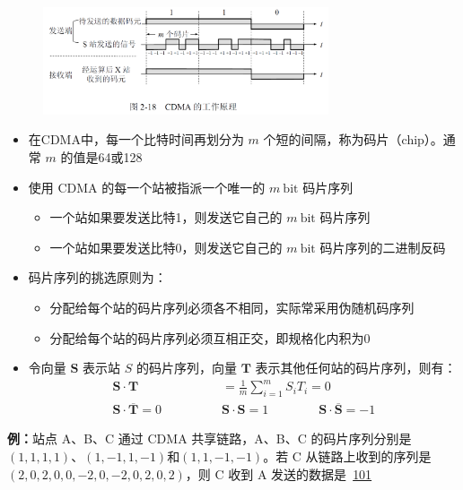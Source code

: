\documentclass[cs4size,a4paper,10pt]{ctexart}
\begin{document}
	\begin{figure}[H]
		\centering
		\includegraphics[width=0.75\textwidth]{img/2.18}
	\end{figure}

	\begin{itemize}
		\item 在CDMA中，每一个比特时间再划分为 $m$ 个短的间隔，称为码片（chip）。通常 $m$ 的值是64或128
		\item 使用 CDMA 的每一个站被指派一个唯一的 $m \ \mathrm{bit}$ 码片序列
		\begin{itemize}
			\item 一个站如果要发送比特1，则发送它自己的 $m \ \mathrm{bit}$ 码片序列
			\item 一个站如果要发送比特0，则发送它自己的 $m \ \mathrm{bit}$ 码片序列的二进制反码
		\end{itemize}
		\item 码片序列的挑选原则为：
		\begin{itemize}
			\item 分配给每个站的码片序列必须各不相同，实际常采用伪随机码序列
			\item 分配给每个站的码片序列必须互相正交，即规格化内积为0
		\end{itemize}
		\item 令向量 $\boldsymbol{S}$ 表示站 $S$ 的码片序列，向量 $\boldsymbol{T}$ 表示其他任何站的码片序列，则有：
		$$
		\begin{aligned}
			\boldsymbol{S}\cdot \boldsymbol{T} & =\frac{1}{m}\sum_{i=1}^m S_iT_i=0 \\
		\boldsymbol{S}\cdot \overline{\boldsymbol{T}}=0\quad\quad\quad\quad
		& \boldsymbol{S}\cdot \boldsymbol{S}=1\quad\quad\quad\quad
		\boldsymbol{S}\cdot \overline{\boldsymbol{S}}=-1
		\end{aligned}
		$$
	\end{itemize}

	\textbf{例：}站点 A、B、C 通过 CDMA 共享链路，A、B、C 的码片序列分别是$(1,1,1,1)$、$(1,-1,1,-1)$和$(1,1,-1,-1)$。若 C 从链路上收到的序列是$(2,0,2,0,0,-2,0,-2,0,2,0,2)$，则 C 收到 A 发送的数据是\ \underline{101} 
\end{document}
